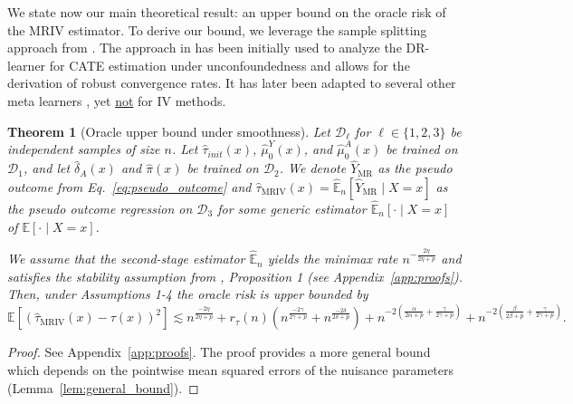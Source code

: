 \documentclass{article} %
\newcommand{\E}{\mathbb{E}}
\newcommand{\frameworkname}{MRIV\xspace}
\theoremstyle{definition}
\theoremstyle{plain}
\newtheorem{theorem}{Theorem}
\begin{document}
We state now our main theoretical result: an upper bound on the oracle risk of the \frameworkname estimator. To derive our bound, we leverage the sample splitting approach from \citep{Kennedy.2022d}. The approach in \citep{Kennedy.2022d} has been initially used to analyze the DR-learner for CATE estimation under unconfoundedness and allows for the derivation of robust convergence rates. It has later been adapted to several other meta learners \citep{Curth.2021}, yet \underline{not} for IV methods.

\begin{theorem}[Oracle upper bound under smoothness]\label{thrm:upperbound}
Let $\mathcal{D}_\ell$ for $\ell \in \{1,2,3\}$ be independent samples of size $n$. Let $\hat{\tau}_{init}(x)$, $\hat{\mu}_0^Y(x)$, and $\hat{\mu}_0^A(x)$ be trained on $\mathcal{D}_1$, and let $\hat{\delta}_A(x)$ and $\hat{\pi}(x)$ be trained on $\mathcal{D}_2$. We denote $\hat{Y}_{\mathrm{\mathrm{MR}}}$ as the pseudo outcome from Eq.~\eqref{eq:pseudo_outcome} and $\hat{\tau}_{\mathrm{MRIV}}(x) = \hat{\E}_n[\hat{Y}_{\mathrm{\mathrm{MR}}} \mid X = x]$ as the pseudo outcome regression on $\mathcal{D}_3$ for some generic estimator $\hat{\E}_n[ \cdot \mid X =x]$ of $\E[ \cdot \mid X =x]$.

We assume that the second-stage estimator $\hat{\E}_n$ yields the minimax rate $n^{-\frac{2\eta}{2\eta + p}}$ and satisfies the stability assumption from \citet{Kennedy.2022d}, Proposition 1 (see Appendix~\ref{app:proofs}). Then, under Assumptions 1-4 the oracle risk is upper bounded by
\begin{equation*}\label{eq:upperbound_mriv}
    \E\left[\left(\hat{\tau}_{\mathrm{MRIV}}(x) - \tau(x)\right)^2\right] \lesssim   n^{\frac{-2\eta}{2\eta+p}} + r_{\tau}(n) \left(n^{\frac{-2\gamma}{2\gamma+p}} + n^{\frac{-2\delta}{2\delta+p}}  \right) + 
    n^{-2\left(\frac{\alpha}{2\alpha+p}+\frac{\gamma}{2\gamma+p}\right)} +
    n^{-2\left(\frac{\beta}{2\beta+p}+\frac{\gamma}{2\gamma+p}\right)} .
\end{equation*}
\end{theorem}
\vspace{-0.4cm}
\begin{proof}
See Appendix~\ref*{app:proofs}. The proof provides a more general bound which depends on the pointwise mean squared errors of the nuisance parameters (Lemma~\ref{lem:general_bound}).
\end{proof}

\vspace{-0.3cm}
\end{document}
